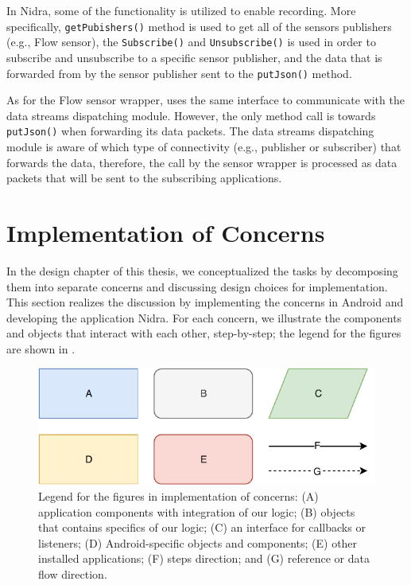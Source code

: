 In Nidra, some of the functionality is utilized to enable recording. More specifically, \verb|getPubishers()| method is used to get all of the sensors publishers (e.g., Flow sensor), the \verb|Subscribe()| and \verb|Unsubscribe()| is used in order to subscribe and unsubscribe to a specific sensor publisher, and the data that is forwarded from by the sensor publisher sent to the \verb|putJson()| method.

As for the Flow sensor wrapper, uses the same interface to communicate with the data streams dispatching module. However, the only method call is towards \verb|putJson()| when forwarding its data packets. The data streams dispatching module is aware of which type of connectivity (e.g., publisher or subscriber) that forwards the data, therefore, the call by the sensor wrapper is processed as data packets that will be sent to the subscribing applications. 

\section{Implementation of Concerns} \label{impl:ioc}
In the design chapter of this thesis, we conceptualized the tasks by decomposing them into separate concerns and discussing design choices for implementation. This section realizes the discussion by implementing the concerns in Android and developing the application Nidra. For each concern, we illustrate the components and objects that interact with each other, step-by-step; the legend for the figures are shown in . 

\begin{figure}[!h]
    \centering
    \includegraphics[scale=0.7]{images/Legend.pdf}
    \caption{Legend for the figures in implementation of concerns: (A) application components with integration of our logic; (B) objects that contains specifics of our logic; (C) an interface for callbacks or listeners; (D) Android-specific objects and components; (E) other installed applications; (F) steps direction; and (G) reference or data flow direction.}
    \label{fig:legend}
\end{figure}

